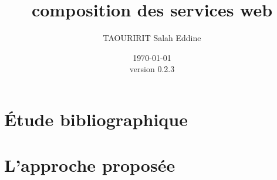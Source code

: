 \documentclass[a4paper, oneside, 12pt]{report}
\author{TAOURIRIT Salah Eddine}
\title{composition des services web}
\date{\today\\version 0.2.3}
\begin{document}
\let\Item\item
\newcommand{\head}[1]{\textnormal{\textbf{#1}}}
\newcommand\SpecialItem{\renewcommand\item[1][]{\Item[\textbullet~\sffamily ##1]}}
\newcommand\SpecialItemi{\renewcommand\item[1][]{\Item[\textendash~\sffamily ##1]}}
\renewcommand\enddescription{\endlist\global\let\item\Item}
\renewcommand{\descriptionlabel}[1]{\hspace{1cm}\textsf{#1}} 
\newtheorem{mydef}{Definition}

\maketitle 

\setcounter{secnumdepth}{4}
\setcounter{tocdepth}{4}

\tableofcontents

\printglossaries
\listoffigures
\listoftables



\part{Étude bibliographique}




\part{L'approche proposée}




\end{document}
